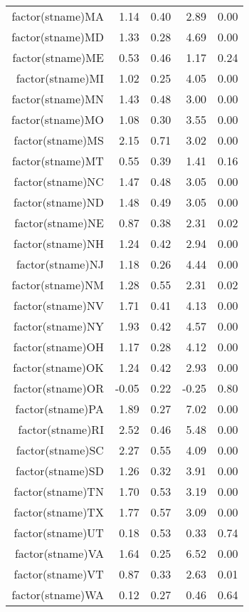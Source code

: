 \begin{table}[ht]
\begin{tabular}{rrrrr}
  factor(stname)MA & 1.14 & 0.40 & 2.89 & 0.00 \\ 
  factor(stname)MD & 1.33 & 0.28 & 4.69 & 0.00 \\ 
  factor(stname)ME & 0.53 & 0.46 & 1.17 & 0.24 \\ 
  factor(stname)MI & 1.02 & 0.25 & 4.05 & 0.00 \\ 
  factor(stname)MN & 1.43 & 0.48 & 3.00 & 0.00 \\ 
  factor(stname)MO & 1.08 & 0.30 & 3.55 & 0.00 \\ 
  factor(stname)MS & 2.15 & 0.71 & 3.02 & 0.00 \\ 
  factor(stname)MT & 0.55 & 0.39 & 1.41 & 0.16 \\ 
  factor(stname)NC & 1.47 & 0.48 & 3.05 & 0.00 \\ 
  factor(stname)ND & 1.48 & 0.49 & 3.05 & 0.00 \\ 
  factor(stname)NE & 0.87 & 0.38 & 2.31 & 0.02 \\ 
  factor(stname)NH & 1.24 & 0.42 & 2.94 & 0.00 \\ 
  factor(stname)NJ & 1.18 & 0.26 & 4.44 & 0.00 \\ 
  factor(stname)NM & 1.28 & 0.55 & 2.31 & 0.02 \\ 
  factor(stname)NV & 1.71 & 0.41 & 4.13 & 0.00 \\ 
  factor(stname)NY & 1.93 & 0.42 & 4.57 & 0.00 \\ 
  factor(stname)OH & 1.17 & 0.28 & 4.12 & 0.00 \\ 
  factor(stname)OK & 1.24 & 0.42 & 2.93 & 0.00 \\ 
  factor(stname)OR & -0.05 & 0.22 & -0.25 & 0.80 \\ 
  factor(stname)PA & 1.89 & 0.27 & 7.02 & 0.00 \\ 
  factor(stname)RI & 2.52 & 0.46 & 5.48 & 0.00 \\ 
  factor(stname)SC & 2.27 & 0.55 & 4.09 & 0.00 \\ 
  factor(stname)SD & 1.26 & 0.32 & 3.91 & 0.00 \\ 
  factor(stname)TN & 1.70 & 0.53 & 3.19 & 0.00 \\ 
  factor(stname)TX & 1.77 & 0.57 & 3.09 & 0.00 \\ 
  factor(stname)UT & 0.18 & 0.53 & 0.33 & 0.74 \\ 
  factor(stname)VA & 1.64 & 0.25 & 6.52 & 0.00 \\ 
  factor(stname)VT & 0.87 & 0.33 & 2.63 & 0.01 \\ 
  factor(stname)WA & 0.12 & 0.27 & 0.46 & 0.64 \\ 

\end{tabular}
\end{table}
